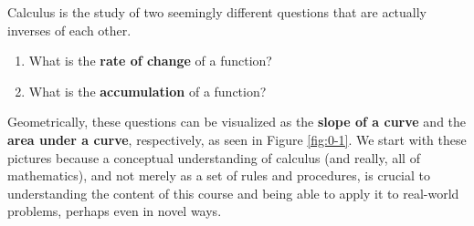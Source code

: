 Calculus is the study of two seemingly different questions that are actually inverses of each other.
\begin{enumerate}
    \item What is the {\bf rate of change} of a function?
    \item What is the {\bf accumulation} of a function?
\end{enumerate}
Geometrically, these questions can be visualized as the {\bf slope of a curve} and the {\bf area under a curve}, respectively, as seen in Figure \ref{fig:0-1}. We start with these pictures because a conceptual understanding of calculus (and really, all of mathematics), and not merely as a set of rules and procedures, is crucial to understanding the content of this course and being able to apply it to real-world problems, perhaps even in novel ways.
